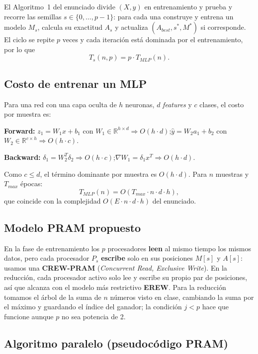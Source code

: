 \documentclass[11pt,a4paper]{article}
\begin{document}
El Algoritmo~1 del enunciado divide $(X,y)$ en entrenamiento y prueba y recorre las semillas $s\in\{0,\dots,p-1\}$: para cada una construye y entrena un modelo $M_s$, calcula su exactitud $A_s$ y actualiza $(A_{best},s^*,M^*)$ si corresponde. El ciclo se repite $p$ veces y cada iteración está dominada por el entrenamiento, por lo que
\[ T_s(n,p) = p\cdot T_{MLP}(n). \]

\subsection{Costo de entrenar un MLP}
\label{sec:tmlp}

Para una red con una capa oculta de $h$ neuronas, $d$ \emph{features} y $c$ clases, el costo por muestra es:

\textbf{Forward:} $z_1 = W_1x + b_1$ con $W_1\in\mathbb{R}^{h\times d}\Rightarrow O(h\cdot d)$;\quad $\hat y = W_2a_1+b_2$ con $W_2\in\mathbb{R}^{c\times h}\Rightarrow O(h\cdot c)$.

\textbf{Backward:} $\delta_1 = W_2^{T}\delta_2 \Rightarrow O(h\cdot c)$;\quad $\nabla W_1 = \delta_1 x^{T} \Rightarrow O(h\cdot d)$.

Como $c \le d$, el término dominante por muestra es $O(h\cdot d)$. Para $n$ muestras y $T_{max}$ épocas:
\[ T_{MLP}(n) = O(T_{max}\cdot n\cdot d\cdot h), \]
que coincide con la complejidad $O(E\cdot n\cdot d\cdot h)$ del enunciado.

\subsection{Modelo PRAM propuesto}

En la fase de entrenamiento los $p$ procesadores \textbf{leen} al mismo tiempo los mismos datos, pero cada procesador $P_s$ \textbf{escribe} solo en sus posiciones $M[s]$ y $A[s]$: usamos una \textbf{CREW-PRAM} (\emph{Concurrent Read, Exclusive Write}). En la reducción, cada procesador activo solo lee y escribe su propio par de posiciones, así que alcanza con el modelo más restrictivo \textbf{EREW}. Para la reducción tomamos el árbol de la suma de $n$ números visto en clase, cambiando la suma por el máximo y guardando el índice del ganador; la condición $j<p$ hace que funcione aunque $p$ no sea potencia de 2.

\subsection{Algoritmo paralelo (pseudocódigo PRAM)}
\end{document}
